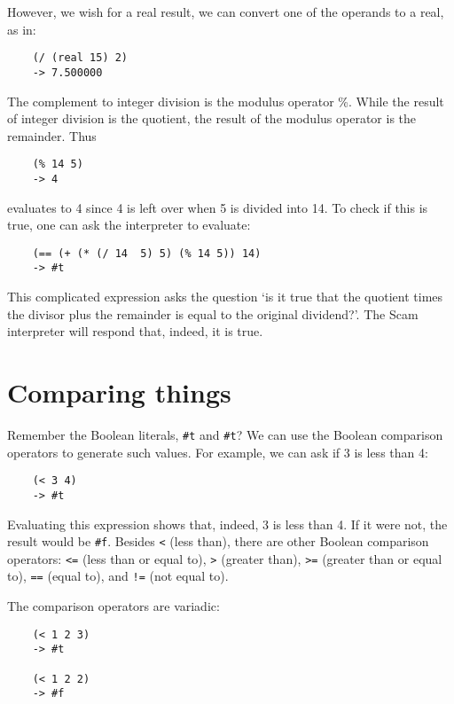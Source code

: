 However, we wish for a real result, we can convert one of
the operands to a real, as in:

\begin{verbatim}
    (/ (real 15) 2)
    -> 7.500000
\end{verbatim}

The complement to integer division is the modulus operator \%. While the
result of integer division is the quotient, the result of the modulus
operator is the remainder. Thus

\begin{verbatim}
    (% 14 5)
    -> 4
\end{verbatim}

evaluates to 4 since 4 is left over when 5 is divided into 14. To check
if this is true, one can ask the interpreter to evaluate:

\begin{verbatim}
    (== (+ (* (/ 14  5) 5) (% 14 5)) 14)
    -> #t
\end{verbatim}

This complicated expression asks the question `is it true that the
quotient times the divisor plus the remainder is equal to the original
dividend?'. The Scam interpreter will respond that, indeed, it is
true. 

\section{Comparing things}

Remember the {\sc Boolean} literals, {\tt \#t} and {\tt \#t}?
We can use the {\sc Boolean}
comparison operators to generate such values. For example, we can ask
if 3 is less than 4:

\begin{verbatim}
    (< 3 4)
    -> #t
\end{verbatim}

Evaluating this expression shows that, indeed, 3 is less than 4. If it were
not, the result would be {\tt \#f}.
Besides
{\tt <}
(less than),
there are other {\sc Boolean} comparison operators:
{\tt <=}
(less than or equal to),
{\tt >}
(greater than),
{\tt >=}
(greater than or equal to),
{\tt ==}
(equal to), and
{\tt !=}
(not equal to).

The comparison operators are variadic:

\begin{verbatim}
    (< 1 2 3)
    -> #t

    (< 1 2 2)
    -> #f
\end{verbatim}

